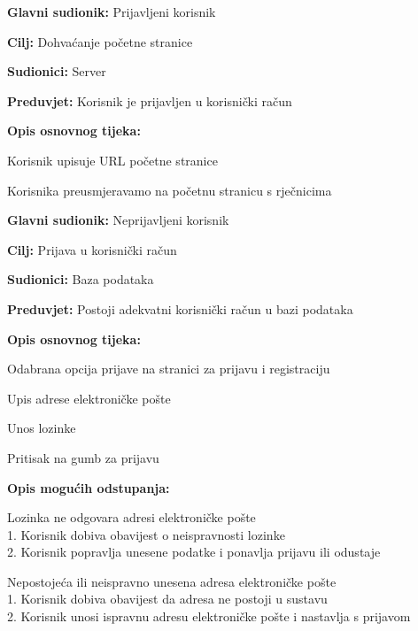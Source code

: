					\noindent {}
					\begin{packed_item}
						\item \textbf{Glavni sudionik:} Prijavljeni korisnik
						\item \textbf{Cilj:} Dohvaćanje početne stranice
						\item \textbf{Sudionici:} Server
						\item \textbf{Preduvjet:} Korisnik je prijavljen u korisnički račun
						\item \textbf{Opis osnovnog tijeka:}
						\begin{packed_enum}
							\item Korisnik upisuje URL početne stranice
							\item Korisnika preusmjeravamo na početnu stranicu s rječnicima
						\end{packed_enum}
					\end{packed_item}


					\noindent \underbar{\textbf{UC2 Prijava u sustav}}
					\begin{packed_item}
						\item \textbf{Glavni sudionik:} Neprijavljeni korisnik
						\item \textbf{Cilj:} Prijava u korisnički račun
						\item \textbf{Sudionici:} Baza podataka
						\item \textbf{Preduvjet:} Postoji adekvatni korisnički račun u bazi podataka
						\item \textbf{Opis osnovnog tijeka:}
						\begin{packed_enum}
							\item Odabrana opcija prijave na stranici za prijavu i registraciju
							\item Upis adrese elektroničke pošte
							\item Unos lozinke
							\item Pritisak na gumb za prijavu
						\end{packed_enum}
						\item \textbf{Opis mogućih odstupanja:}
						\begin{packed_item}
							\item[3.a] Lozinka ne odgovara adresi elektroničke pošte
							\\1. Korisnik dobiva obavijest o neispravnosti lozinke
							\\2. Korisnik popravlja unesene podatke i ponavlja prijavu ili odustaje
							\item[2.a] Nepostojeća ili neispravno unesena adresa elektroničke pošte
							\\1. Korisnik dobiva obavijest da adresa ne postoji u sustavu
							\\2. Korisnik unosi ispravnu adresu elektroničke pošte i nastavlja s prijavom
						\end{packed_item}
					\end{packed_item}
					
